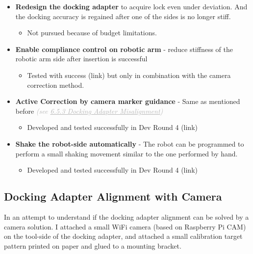 \begin{itemize}
	\item \textbf{Redesign the docking adapter} to acquire lock even under deviation. And the docking accuracy is regained after one of the sides is no longer stiff.

\begin{itemize}
	\item Not pursued because of budget limitations.

\end{itemize}
	\item \textbf{Enable compliance control on robotic arm }- reduce stiffness of the robotic arm side after insertion is successful

\begin{itemize}
	\item Tested with success (link) but only in combination with the camera correction method.

\end{itemize}
	\item \textbf{Active Correction by camera marker guidance} - Same as mentioned before \textit{\textcolor[HTML]{B7B7B7}{(see \uline{6.5.3 Docking Adapter Misalignment})}}

\begin{itemize}
	\item Developed and tested successfully in Dev Round 4 (link)

\end{itemize}
	\item \textbf{Shake the robot-side automatically} - The robot can be programmed to perform a small shaking movement similar to the one performed by hand.

\begin{itemize}
	\item Developed and tested successfully in Dev Round 4 (link)

\end{itemize}
\end{itemize}

\subsection{Docking Adapter Alignment with Camera}

In an attempt to understand if the docking adapter alignment can be solved by a camera solution. I attached a small WiFi camera (based on Raspberry Pi CAM) on the tool-side of the docking adapter, and attached a small calibration target pattern printed on paper and glued to a mounting bracket.

